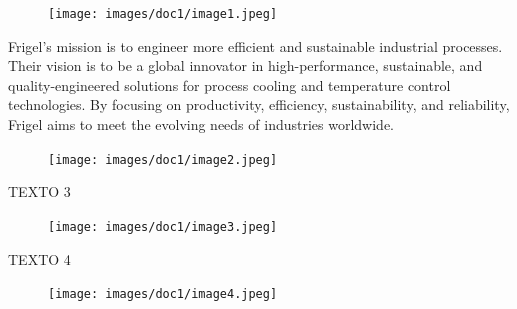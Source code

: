 \documentclass{article}%
\begin{document}
\begin{figure}[H]
\centering
\texttt{[image: images/doc1/image1.jpeg]}
\end{figure}

Frigel's mission is to engineer more efficient and sustainable industrial processes. Their vision is to be a global innovator in high-performance, sustainable, and quality-engineered solutions for process cooling and temperature control technologies. By focusing on productivity, efficiency, sustainability, and reliability, Frigel aims to meet the evolving needs of industries worldwide.

\begin{figure}[H]
\centering
\texttt{[image: images/doc1/image2.jpeg]}
\end{figure}

TEXTO 3

\begin{figure}[H]
\centering
\texttt{[image: images/doc1/image3.jpeg]}
\end{figure}

TEXTO 4

\begin{figure}[H]
\centering
\texttt{[image: images/doc1/image4.jpeg]}
\end{figure}

%
\end{document}
